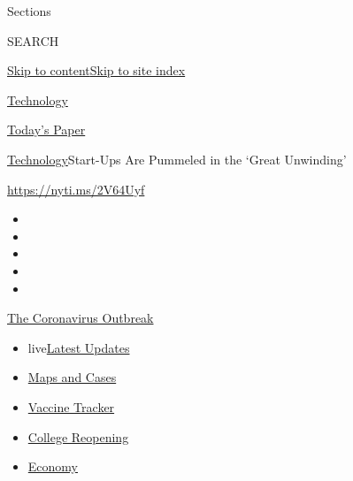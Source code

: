 Sections

SEARCH

\protect\hyperlink{site-content}{Skip to
content}\protect\hyperlink{site-index}{Skip to site index}

\href{https://www.nytimes3xbfgragh.onion/section/technology}{Technology}

\href{https://myaccount.nytimes3xbfgragh.onion/auth/login?response_type=cookie\&client_id=vi}{}

\href{https://www.nytimes3xbfgragh.onion/section/todayspaper}{Today's
Paper}

\href{/section/technology}{Technology}\textbar{}Start-Ups Are Pummeled
in the `Great Unwinding'

\url{https://nyti.ms/2V64Uyf}

\begin{itemize}
\item
\item
\item
\item
\item
\end{itemize}

\href{https://www.nytimes3xbfgragh.onion/news-event/coronavirus?action=click\&pgtype=Article\&state=default\&region=TOP_BANNER\&context=storylines_menu}{The
Coronavirus Outbreak}

\begin{itemize}
\tightlist
\item
  live\href{https://www.nytimes3xbfgragh.onion/2020/08/03/world/coronavirus-covid-19.html?action=click\&pgtype=Article\&state=default\&region=TOP_BANNER\&context=storylines_menu}{Latest
  Updates}
\item
  \href{https://www.nytimes3xbfgragh.onion/interactive/2020/us/coronavirus-us-cases.html?action=click\&pgtype=Article\&state=default\&region=TOP_BANNER\&context=storylines_menu}{Maps
  and Cases}
\item
  \href{https://www.nytimes3xbfgragh.onion/interactive/2020/science/coronavirus-vaccine-tracker.html?action=click\&pgtype=Article\&state=default\&region=TOP_BANNER\&context=storylines_menu}{Vaccine
  Tracker}
\item
  \href{https://www.nytimes3xbfgragh.onion/2020/08/02/us/covid-college-reopening.html?action=click\&pgtype=Article\&state=default\&region=TOP_BANNER\&context=storylines_menu}{College
  Reopening}
\item
  \href{https://www.nytimes3xbfgragh.onion/live/2020/08/03/business/stock-market-today-coronavirus?action=click\&pgtype=Article\&state=default\&region=TOP_BANNER\&context=storylines_menu}{Economy}
\end{itemize}

